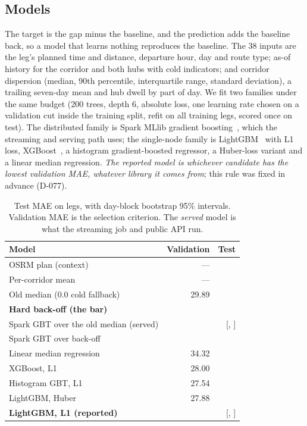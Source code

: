 \subsection{Models}
The target is the gap minus the baseline, and the prediction adds the baseline back, so a model that learns nothing reproduces the baseline. The 38 inputs are the leg's planned time and distance, departure hour, day and route type; as-of history for the corridor and both hubs with cold indicators; and corridor dispersion (median, 90th percentile, interquartile range, standard deviation), a trailing seven-day mean and hub dwell by part of day. We fit two families under the same budget (200 trees, depth 6, absolute loss, one learning rate chosen on a validation cut inside the training split, refit on all training legs, scored once on test). The distributed family is Spark MLlib gradient boosting~\cite{friedman2001greedy,meng2016mllib}, which the streaming and serving path \streamsec{} uses; the single-node family is LightGBM~\cite{ke2017lightgbm} with L1 loss, XGBoost~\cite{chen2016xgboost}, a histogram gradient-boosted regressor, a Huber-loss variant and a linear median regression. \emph{The reported model is whichever candidate has the lowest validation MAE, whatever library it comes from}; this rule was fixed in advance (D-077).

\begin{table}[t]
\caption{Test MAE on \fzSplitTest{} legs, with day-block bootstrap 95\% intervals. Validation MAE is the selection criterion. The \emph{served} model is what the streaming job and public API run.}
\label{tab:mae}
\centering
\begin{tabular}{@{}lrr@{}}
\toprule
Model & Validation & Test \\
\midrule
OSRM plan (context) & --- & \fzMaeOsrm{} \\
Per-corridor mean & --- & \fzMaeCorridorMean{} \\
Old median (0.0 cold fallback) & 29.89 & \fzBarOldMedianMaeDpTwo{} \\
\textbf{Hard back-off (the bar)} & \fzBarBackoffValidationMaeDpTwo{} & \textbf{\fzBarBackoffMaeDpTwo{}} \\
Spark GBT over the old median (served) & \fzVTwoValidationMaeDpTwo{} & \fzServedMaeDpTwo{} [\fzServedMaeCiLowDpOne{}, \fzServedMaeCiHighDpOne{}] \\
Spark GBT over back-off & \fzVThreeValidationMaeDpTwo{} & \fzVThreeTestMaeDpTwo{} \\
Linear median regression & 34.32 & \fzZooLinearMaeDpTwo{} \\
XGBoost, L1 & 28.00 & \fzZooXgboostMaeDpTwo{} \\
Histogram GBT, L1 & 27.54 & \fzZooHistgbrMaeDpTwo{} \\
LightGBM, Huber & 27.88 & \fzZooLightgbmHuberMaeDpTwo{} \\
\textbf{LightGBM, L1 (reported)} & \fzReportedValidationMaeDpTwo{} & \textbf{\fzReportedMaeDpTwo{}} [\fzReportedMaeCiLowDpOne{}, \fzReportedMaeCiHighDpOne{}] \\
\bottomrule
\end{tabular}
\end{table}

